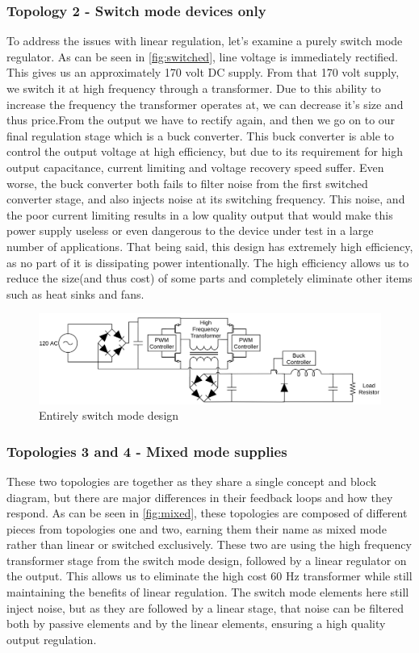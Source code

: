 \documentclass[12pt]{article}
\begin{document}
\subsubsection{Topology 2 - Switch mode devices only}
To address the issues with linear regulation, let's examine a purely switch mode 
regulator. As can be seen in \autoref{fig:switched}, line voltage is immediately rectified. 
This gives us an approximately 170 volt DC supply. From that 170 volt supply, we switch 
it at high frequency through a transformer. Due to this ability to increase the 
frequency the transformer operates at, we can decrease it's size and thus price.From 
the output we have to rectify again, and then we go on to our final regulation stage 
which is a buck converter. This buck converter is able to control the output voltage 
at high efficiency, but due to its requirement for high output capacitance, current 
limiting and voltage recovery speed suffer. Even worse, the buck converter both 
fails to filter noise from the first switched converter stage, and also injects 
noise at its switching frequency. This noise, and the poor current limiting results 
in a low quality output that would make this power supply useless or even dangerous to the device under test in a large number of applications. That being said, this design has extremely high efficiency, as no part of it is dissipating power intentionally. The high efficiency allows us to reduce the size(and thus cost) of some parts and completely eliminate other items such as heat sinks and fans.

\begin{figure}[H]
    \includegraphics[width=\textwidth]{switched}
    \caption{Entirely switch mode design}
    \label{fig:switched}
\end{figure}
\subsubsection{Topologies 3 and 4 - Mixed mode supplies}

These two topologies are together as they share a single concept and block diagram, 
but there are major differences in their feedback loops and how they respond. 
As can be seen in \autoref{fig:mixed}, these topologies are composed of different pieces 
from topologies one and two, earning them their name as mixed mode rather than 
linear or switched exclusively. These two are using the high frequency transformer 
stage from the switch mode design, followed by a linear regulator on the output. 
This allows us to eliminate the high cost 60 Hz transformer while still maintaining 
the benefits of linear regulation. The switch mode elements here still inject noise, 
but as they are followed by a linear stage, that noise can be filtered both by passive 
elements and by the linear elements, ensuring a high quality output regulation.  
\end{document}
